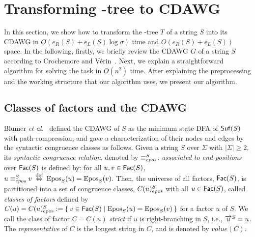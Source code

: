 

  

  

\section{Transforming \LPTrm-tree to CDAWG}
\label{sec:lpt:to:cdawg}
In this section, we show how to transform the \LPTrm-tree $T$ of a string $S$ into its CDAWG in $O(e_R(S) + e_L(S)\log\sigma)$ time and $O(e_R(S) + e_L(S))$ space.
In the following, firstly, we briefly review the CDAWG $G$ of a string $S$ according to Crochemore and V\'erin~\cite{crochemore:verin1997direct}. Next, we explain a straightforward algorithm for solving the task in $O(n^2)$ time. After explaining the preprocessing and the working structure that our algorithm uses, we present our algorithm. 

\subsection{Classes of factors and the CDAWG}

Blumer \textit{et al.}~\cite{blumer1987complete} defined the CDAWG of $S$ as the minimum state DFA of $\mathsf{Suf}{(S)}$ with path-compression, and gave a characterization of their nodes and edges by the syntactic congruence classes as follows. 
Given a string $S$ over $\Sigma$ with $|\Sigma|\ge 2$, its \textit{syntactic congruence relation}, denoted by $\equiv^{S}_{epos}$, \textit{associated to end-positions} over $\mathsf{Fac}{(S)}$ is defined by: for all $u, v \in \mathsf{Fac}{(S)}$, 
\begin{math}
  u \equiv^{S}_{epos} v \mathbin{\,\stackrel{\textrm{def}}{\mathbin{\,\Leftrightarrow\,}}\,} \mathrm{Epos}_{S}(u) = \mathrm{Epos}_{S}(v). 
\end{math}
Then, the universe of all factors, $\mathsf{Fac}{(S)}$, is partitioned into a set of congruence classes, $C({u})^{S}_{\mathrm{epos}}$ with all $u \in \mathsf{Fac}{(S)}$, called \textit{classes of factors} defined by 
$C(u) = C({u})^{S}_{\mathrm{epos}} := \{\kern0.2em v \in \mathsf{Fac}{(S)} \mid \mathrm{Epos}_{S}(u) = \mathrm{Epos}_{S}(v) \kern0.2em\}$
for a factor $u$ of $S$. We call the class of factor $C = C(u)$ \textit{strict} if $u$ is right-branching in $S$, i.e., $\overrightarrow{u}^{S} = u$. 
The \textit{representative} of $C$ is the longest string in $C$, and is denoted by $value(C)$. 

